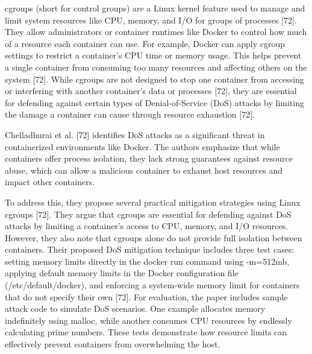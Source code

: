 \documentclass[12pt]{report}
\begin{document}
\begin{doublespace}
cgroups (short for control groups) are a Linux kernel feature used to manage and limit system resources like CPU, memory, and I/O for groups of processes [72]. They allow administrators or container runtimes like Docker to control how much of a resource each container can use. For example, Docker can apply cgroup settings to restrict a container’s CPU time or memory usage. This helps prevent a single container from consuming too many resources and affecting others on the system [72]. While cgroups are not designed to stop one container from accessing or interfering with another container’s data or processes [72], they are essential for defending against certain types of Denial-of-Service (DoS) attacks by limiting the damage a container can cause through resource exhaustion [72].

Chelladhurai et al. [72] identifies DoS attacks as a significant threat in containerized environments like Docker. The authors emphasize that while containers offer process isolation, they lack strong guarantees against resource abuse, which can allow a malicious container to exhaust host resources and impact other containers.

To address this, they propose several practical mitigation strategies using Linux cgroups [72]. They argue that cgroups are essential for defending against DoS attacks by limiting a container’s access to CPU, memory, and I/O resources. However, they also note that cgroups alone do not provide full isolation between containers. Their proposed DoS mitigation technique includes three test cases: setting memory limits directly in the docker run command using -m=512mb, applying default memory limits in the Docker configuration file (/etc/default/docker), and enforcing a system-wide memory limit for containers that do not specify their own [72]. For evaluation, the paper includes sample attack code to simulate DoS scenarios. One example allocates memory indefinitely using malloc, while another consumes CPU resources by endlessly calculating prime numbers. These tests demonstrate how resource limits can effectively prevent containers from overwhelming the host.


\end{doublespace}
\end{document}
